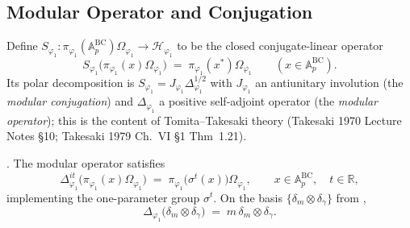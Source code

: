 \subsection{Modular Operator and Conjugation}
\label{v4-arith:kms-gns:cycle1:modular}

Define \(S_{\varphi_{1}}\colon\pi_{\varphi_{1}}(\mathbb{A}^{\mathrm{BC}}_{p})\Omega_{\varphi_{1}}\to\mathcal{H}_{\varphi_{1}}\)
to be the closed conjugate-linear operator
\begin{equation}
\label{v4-arith:kms-gns:eq:S-def}
S_{\varphi_{1}}\bigl(\pi_{\varphi_{1}}(x)\Omega_{\varphi_{1}}\bigr)\;=\;\pi_{\varphi_{1}}(x^{*})\Omega_{\varphi_{1}}\qquad(x\in\mathbb{A}^{\mathrm{BC}}_{p}).
\end{equation}
Its polar decomposition is \(S_{\varphi_{1}}=J_{\varphi_{1}}\Delta_{\varphi_{1}}^{1/2}\)
with \(J_{\varphi_{1}}\) an antiunitary involution
(the \emph{modular conjugation}) and \(\Delta_{\varphi_{1}}\) a
positive self-adjoint operator (the \emph{modular operator}); this
is the content of Tomita--Takesaki theory (Takesaki 1970 Lecture
Notes \S10; Takesaki 1979 Ch.~VI \S1 Thm~1.21).

\begin{lemma}
\label{v4-arith:kms-gns:lem:Delta}
\ClaimStatusProvedHere. The modular operator satisfies
\begin{equation}
\label{v4-arith:kms-gns:eq:Delta-formula}
\Delta_{\varphi_{1}}^{it}\bigl(\pi_{\varphi_{1}}(x)\Omega_{\varphi_{1}}\bigr)\;=\;\pi_{\varphi_{1}}\bigl(\sigma^{t}(x)\bigr)\Omega_{\varphi_{1}},\qquad x\in\mathbb{A}^{\mathrm{BC}}_{p},\quad t\in\mathbb{R},
\end{equation}
implementing the one-parameter group \(\sigma^{t}\). On the basis
\(\{\delta_{m}\otimes\delta_{\gamma}\}\) from
,
\begin{equation}
\label{v4-arith:kms-gns:eq:Delta-basis}
\Delta_{\varphi_{1}}\bigl(\delta_{m}\otimes\delta_{\gamma}\bigr)\;=\;m\,\delta_{m}\otimes\delta_{\gamma}.
\end{equation}
\end{lemma}

